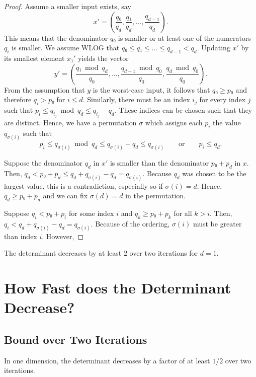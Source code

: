 \documentclass[english,version-2020-11]{uzl-thesis}
\begin{document}
\begin{proof}
  Assume a smaller input exists, say \[x' = \left(\frac{q₀}{q_d}, \frac{q₁}{q_d}, \dots, \frac{q_{d-1}}{q_d} \right).\]
  This means that the denominator $q₀$ is smaller or at least one of the numerators $q_i$ is smaller.
  We assume WLOG that $q₀ ≤ q₁ ≤ \dots ≤ q_{d-1} < q_d$.
  Updating $x'$ by its smallest element $x₁'$ yields the vector
  \[
    y' = \left(
      \frac{q₁ \bmod q_d}{q_0},
      \dots,
      \frac{q_{d-1} \bmod q_0}{q_0},
      \frac{q_d \bmod q_0}{q_0} \right).
  \]
  From the assumption that $y$ is the worst-case input, it follows that $q₀ ≥ p₀$
  and therefore $q_i > p₀$ for $i ≤ d$.
  Similarly, there must be an index $i_j$ for every index $j$
  such that $p_i ≤ q_{i_j} \bmod q_d ≤ q_{i_j} - q_d$.
  These indices can be chosen such that they are distinct.
  Hence, we have a permutation $σ$ which assigns each $p_i$
  the value $q_{σ(i)}$ such that
  \[
    p_i ≤ q_{σ(i)} \bmod q_d ≤ q_{σ(i)} - q_d ≤ q_{σ(i)} \qquad \text{or} \qquad p_i ≤ q_d.
  \]

  Suppose the denominator $q_d$ in $x'$ is smaller than the denominator $p₀ + p_d$ in $x$.
  Then, $q_d < p₀ + p_d ≤ q_d + q_{σ(i)} - q_d = q_{σ(i)}$.
  Because $q_d$ was chosen to be the largest value,
  this is a contradiction, especially so if $σ(i) = d$.
  Hence, $q_d ≥ p₀ + p_d$ and we can fix $σ(d) = d$
  in the permutation.

  Suppose $q_i < p₀ + p_i$ for some index $i$ and $q_k ≥ p₀ + p_k$ for all $k > i$.
  Then, $q_i < q_d + q_{σ(i)} - q_d = q_{σ(i)}$.
  Because of the ordering, $σ(i)$ must be greater than index $i$.
  However,
\end{proof}

\begin{lemma}
  The determinant decreases by at least $2$ over two iterations for $d = 1$.
\end{lemma}

\chapter{How Fast does the Determinant Decrease?}

\section{Bound over Two Iterations}

\begin{proposition}
  In one dimension, the determinant decreases by a factor of at least $1/2$ over
  two iterations.
\end{proposition}
\end{document}
